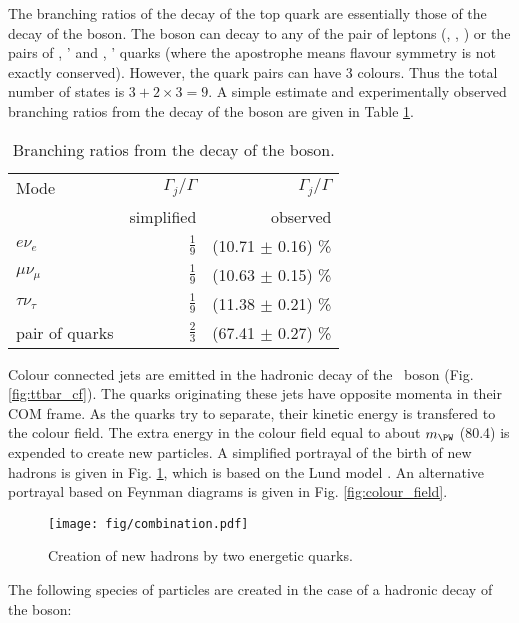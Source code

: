 The branching ratios of the decay of the top quark are essentially those of the decay of the \PW boson. The \PW boson can decay to any of the pair of leptons (\Pe\Pgne, \Pgm\Pgngm, \Pgt\Pgngt) or the pairs of \cPqu, \cPqd' and \cPqc, \cPqs' quarks (where the apostrophe means flavour symmetry is not exactly conserved). However, the quark pairs can have 3 colours. Thus the total number of states is $3+2\times3=9$. A simple estimate and experimentally observed branching ratios from the decay of the \PW boson are given in Table \ref{tab:W_br}.

\begin{table}[h!]
  \centering
  \caption{Branching ratios from the decay of the \PW boson.}
  \label{tab:W_br}
  \begin{tabular}{l r r}
    Mode                  & $\Gamma_{j}/\Gamma$ & $\Gamma_{j}/\Gamma$\\
                          & simplified          & observed \cite{Patrignani:2016xqp}\\
    \hline
    $e\nu_{e}$            & $\frac{1}{9}$       & (10.71 $\pm$ 0.16) \%\\
    $\mu\nu_{\mu}$        & $\frac{1}{9}$       & (10.63 $\pm$ 0.15) \%\\
    $\tau\nu_{\tau}$      & $\frac{1}{9}$       & (11.38 $\pm$ 0.21) \%\\
    pair of quarks        & $\frac{2}{3}$       & (67.41 $\pm$ 0.27) \%
  \end{tabular}
\end{table}


Colour connected jets are emitted in the hadronic decay of the \PW\ boson (Fig. \ref{fig:ttbar_cf}). The quarks originating these jets have opposite momenta in their COM frame. As the quarks try to separate, their kinetic energy is transfered to the colour field. The extra energy in the colour field equal to about $m_{\PW}$ (80.4\GeV) is expended to create new particles. A simplified portrayal of the birth of new hadrons is given in Fig. \ref{fig:combination}, which is based on the Lund model \cite{Andersson:1983ia}. An alternative portrayal based on Feynman diagrams is given in Fig. \ref{fig:colour_field}.

\begin{figure}[htp]
  \centering
  \texttt{[image: fig/combination.pdf]}
  \caption{Creation of new hadrons by two energetic quarks.}
  \label{fig:combination}
\end{figure}


The following species of particles are created in the case of a hadronic decay of the \PW boson:

